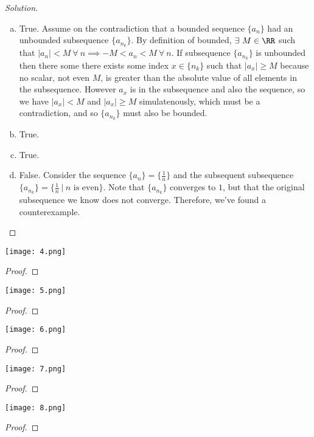 \documentclass[12pt]{scrartcl}
\begin{document}
\begin{proof}[Solution]

\hfill

\begin{enumerate}[a.]
  \item True. Assume on the contradiction that a bounded sequence $\{a_n\}$ had an unbounded subsequence $\{a_{n_k}\}$. 
  By definition of bounded, $\exists \ M \in \RR$ such that $|a_n| < M \ \forall \ n \implies -M < a_n < M \ \forall \ n$.
  If subsequence $\{a_{n_k}\}$ is unbounded then there some there exists some index $x \in \{n_k\}$ such that 
  $|a_x| \geq M$ because no scalar, not even $M$, is greater than the absolute value of all elements in the subsequence. 
  However $a_x$ is in the subsequence and also the sequence, so we have $|a_x| < M$ and $|a_x| \geq M$ simulatenously, which
  must be a contradiction, and so $\{a_{n_k}\}$ must also be bounded.
  \item True. 
  \item True.
  \item False. Consider the sequence $\{a_n\} = \{\frac{1}{n}\}$ and the subsequent subsequence 
  $\{a_{n_k}\} = \{\frac{1}{n} \ | \ n \text{ is even}\}$. Note that $\{a_{n_k}\}$ converges to $1$, 
  but that the original subsequence we know does not converge. Therefore, we've found a counterexample.
\end{enumerate}
  
\end{proof}

\newpage

\texttt{[image: 4.png]}

\begin{proof}
  
\hfill


\end{proof}
\newpage

\texttt{[image: 5.png]}

\begin{proof}
  
\hfill


\end{proof}
\newpage

\texttt{[image: 6.png]}

\begin{proof}
  
\hfill


\end{proof}
\newpage

\texttt{[image: 7.png]}

\begin{proof}
  
\hfill


\end{proof}
\newpage

\texttt{[image: 8.png]}

\begin{proof}
  
\hfill


\end{proof}
\end{document}
